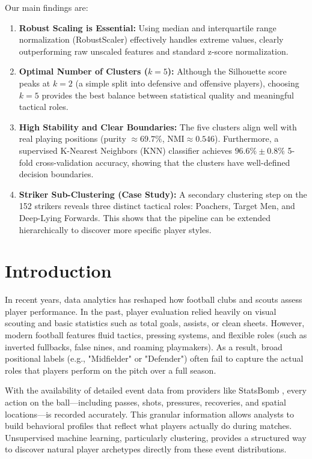\documentclass[12pt]{ai_conquer2026}
\begin{document}
Our main findings are:
\begin{enumerate}
    \item \textbf{Robust Scaling is Essential:} Using median and interquartile range normalization (RobustScaler) effectively handles extreme values, clearly outperforming raw unscaled features and standard z-score normalization.
    \item \textbf{Optimal Number of Clusters ($k=5$):} Although the Silhouette score peaks at $k=2$ (a simple split into defensive and offensive players), choosing $k=5$ provides the best balance between statistical quality and meaningful tactical roles.
    \item \textbf{High Stability and Clear Boundaries:} The five clusters align well with real playing positions (purity $\approx 69.7\%$, $\text{NMI} \approx 0.546$). Furthermore, a supervised K-Nearest Neighbors (KNN) classifier achieves $96.6\% \pm 0.8\%$ 5-fold cross-validation accuracy, showing that the clusters have well-defined decision boundaries.
    \item \textbf{Striker Sub-Clustering (Case Study):} A secondary clustering step on the 152 strikers reveals three distinct tactical roles: Poachers, Target Men, and Deep-Lying Forwards. This shows that the pipeline can be extended hierarchically to discover more specific player styles.
\end{enumerate}

\newpage
\setcounter{tocdepth}{2}
\tableofcontents
\thispagestyle{fancy}

\newpage
\section{Introduction}

In recent years, data analytics has reshaped how football clubs and scouts assess player performance. In the past, player evaluation relied heavily on visual scouting and basic statistics such as total goals, assists, or clean sheets. However, modern football features fluid tactics, pressing systems, and flexible roles (such as inverted fullbacks, false nines, and roaming playmakers). As a result, broad positional labels (e.g., "Midfielder" or "Defender") often fail to capture the actual roles that players perform on the pitch over a full season.

With the availability of detailed event data from providers like StatsBomb \cite{statsbomb_open_data}, every action on the ball—including passes, shots, pressures, recoveries, and spatial locations—is recorded accurately. This granular information allows analysts to build behavioral profiles that reflect what players actually do during matches. Unsupervised machine learning, particularly clustering, provides a structured way to discover natural player archetypes directly from these event distributions.
\end{document}
